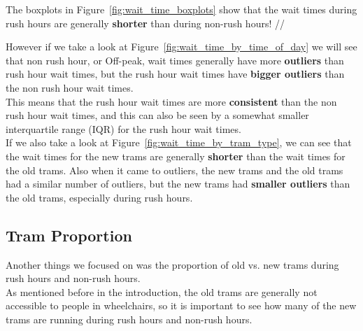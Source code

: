 \documentclass[a4paper, 10pt]{article}
\begin{document}
				\noindent The boxplots in Figure~\ref{fig:wait_time_boxplots} show that the wait times during
				rush hours are generally \textbf{shorter} than during non-rush hours! //

				\noindent However if we take a look at Figure~\ref{fig:wait_time_by_time_of_day} we will see that 
				non rush hour, or Off-peak, wait times generally have more \textbf{outliers} than rush hour wait times, but
				the rush hour wait times have \textbf{bigger outliers} than the non rush hour wait times. \\

				\noindent This means that the rush hour wait times are more \textbf{consistent} 
				than the non rush hour wait times, and this can also be seen by a somewhat smaller interquartile range (IQR) 
				for the rush hour wait times. \\

				\noindent If we also take a look at Figure~\ref{fig:wait_time_by_tram_type}, 
				we can see that the wait times for the new trams are generally 
				\textbf{shorter} than the wait times for the old trams. Also when it came to outliers, 
				the new trams and the old trams had a similar number of outliers, 
				but the new trams had \textbf{smaller outliers} than the old trams, especially during rush hours. \\

		\subsection{Tram Proportion}
				\noindent Another things we focused on was the proportion of old vs. new trams during rush hours and non-rush hours. \\

				\noindent As mentioned before in the introduction, the old trams are generally not accessible to people in wheelchairs,
				so it is important to see how many of the new trams are running during rush hours and non-rush hours. \\
\end{document}
